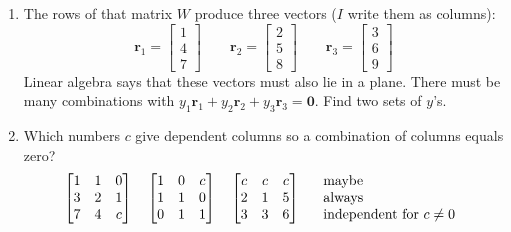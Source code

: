 \documentclass[14pt, a4paper]{article}
\begin{document}
\begin{enumerate}
    \item The rows of that matrix $W$ produce three vectors ($I$ write them as columns):
          \[
              \boldsymbol{r}_1 = \begin{bmatrix} 1 \\ 4 \\ 7 \end{bmatrix} \quad\quad
              \boldsymbol{r}_2 = \begin{bmatrix} 2 \\ 5 \\ 8 \end{bmatrix} \quad\quad
              \boldsymbol{r}_3 = \begin{bmatrix} 3 \\ 6 \\ 9 \end{bmatrix}
          \]
          Linear algebra says that these vectors must also lie in a plane. There must be many combinations with $y_1\boldsymbol{r}_1 + y_2\boldsymbol{r}_2 + y_3\boldsymbol{r}_3 = \boldsymbol{0}$. Find two sets of $y$'s.

    \item Which numbers $c$ give dependent columns so a combination of columns equals zero?
          \[
              \begin{bmatrix}
                  1 & 1 & 0 \\  3 & 2 & 1 \\  7 & 4 & c
              \end{bmatrix}
              \quad
              \begin{bmatrix}
                  1 & 0 & c \\ 1 & 1 & 0 \\  0 & 1 & 1
              \end{bmatrix}
              \quad
              \begin{bmatrix}
                  c & c & c \\  2 & 1 & 5 \\ 3 & 3 & 6
              \end{bmatrix}
              \quad
              \begin{tabular}{l}
              maybe \\
              always \\
              independent for $c \ne 0$
              \end{tabular}
          \]


\end{enumerate}
\end{document}
